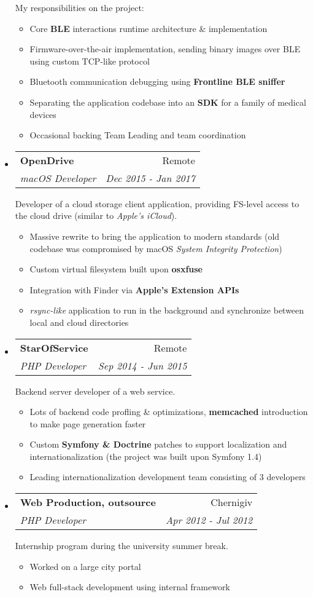 \documentclass[letterpaper,11pt]{article}
\makeatletter
\newcommand{\resitem}[1]{\item #1 \vspace{-2pt}}
\newcommand{\ressubheading}[4]{
\begin{tabular*}{7.1in}{l@{\extracolsep{\fill}}r}
		\textbf{#1} & #2 \\
		\textit{#3} & \textit{#4} \\
\end{tabular*}\vspace{-6pt}}
\makeatother
\begin{document}
\begin{itemize}
		My responsibilities on the project:
		\begin{itemize}
				\resitem{Core \textbf{BLE} interactions runtime architecture \& implementation}
				\resitem{Firmware-over-the-air implementation, sending binary images over BLE using custom TCP-like protocol}
				\resitem{Bluetooth communication debugging using \textbf{Frontline BLE sniffer}}
				\resitem{Separating the application codebase into an \textbf{SDK} for a family of medical devices}
				\resitem{Occasional backing Team Leading and team coordination}
		\end{itemize}
\pagebreak
	\item
		\ressubheading{OpenDrive}{Remote}{macOS Developer}{Dec 2015 - Jan 2017}

		Developer of a cloud storage client application, providing FS-level access to the cloud drive (similar to \textit{Apple's iCloud}).
		\begin{itemize}
				\resitem{Massive rewrite to bring the application to modern standards (old codebase was compromised by macOS \textit{System Integrity Protection})}
				\resitem{Custom virtual filesystem built upon \textbf{osxfuse}}
				\resitem{Integration with Finder via \textbf{Apple's Extension APIs}}
				\resitem{\textit{rsync-like} application to run in the background and synchronize between local and cloud directories}
		\end{itemize}

	\item
		\ressubheading{StarOfService}{Remote}{PHP Developer}{Sep 2014 - Jun 2015}

		Backend server developer of a web service.
		\begin{itemize}
				\resitem{Lots of backend code profling \& optimizations, \textbf{memcached} introduction to make page generation faster}
				\resitem{Custom \textbf{Symfony \& Doctrine} patches to support localization and internationalization (the project was built upon Symfony 1.4)}
				\resitem{Leading internationalization development team consisting of 3 developers}
		\end{itemize}

	\item
		\ressubheading{Web Production, outsource}{Chernigiv}{PHP Developer}{Apr 2012 - Jul 2012}

		Internship program during the university summer break.
		\begin{itemize}
				\resitem{Worked on a large city portal}
				\resitem{Web full-stack development using internal framework}
		\end{itemize}
		
\end{itemize}
\end{document}

